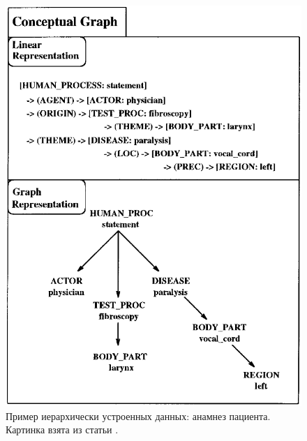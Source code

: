 \begin{figure}[!ht]
\begin{center}
    \includegraphics[scale=0.45]{./assets/rvnn-data-tree.png}
    \caption{\label{rvnn-data-tree} Пример иерархически устроенных данных: анамнез пациента. Картинка взята из статьи \cite{rvnn-intro-paper}.}
\end{center}


\end{figure}
